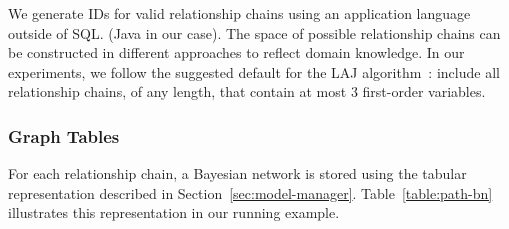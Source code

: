 We generate IDs for valid relationship chains using an application language outside of SQL. (Java in our case). The space of possible relationship chains can be constructed in different approaches to reflect domain knowledge. In our experiments, we follow the suggested default for the LAJ algorithm~\cite{Schulte2012}: include all relationship chains, of any length, that contain at most 3 first-order variables.

\subsubsection{Graph Tables}

For each relationship chain, a Bayesian network is stored using the tabular representation described in Section~\ref{sec:model-manager}. Table~\ref{table:path-bn} illustrates this representation in our running example.


\begin{table}[htdp]
\caption{Tabular representation of the Bayesian multi-net from Figure~\ref{fig:lattice}. Top: Edges learned for the relationship chain RA(P,S). Bottom: Edges learned for first-order variables Prof and Student. Bayes net learning found no edges (correlations) for attributes of Courses. $P$ ranges over professors, $S$ over students.}
\begin{center}
\end{center}
\label{table:path-bn}
\end{table}%


